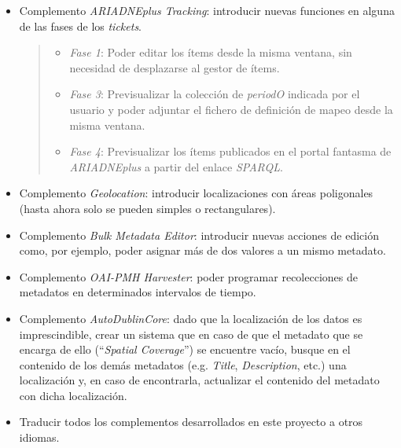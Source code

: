 \begin{itemize}
\item
  Complemento \emph{ARIADNEplus Tracking}: introducir nuevas funciones
  en alguna de las fases de los \emph{tickets}.

  \begin{quote}
  \begin{itemize}
  \tightlist
  \item
    \emph{Fase 1}: Poder editar los ítems desde la misma ventana, sin
    necesidad de desplazarse al gestor de ítems.
  \item
    \emph{Fase 3}: Previsualizar la colección de \emph{periodO} indicada
    por el usuario y poder adjuntar el fichero de definición de mapeo
    desde la misma ventana.
  \item
    \emph{Fase 4}: Previsualizar los ítems publicados en el portal
    fantasma de \emph{ARIADNEplus} a partir del enlace \emph{SPARQL}.
  \end{itemize}
  \end{quote}
\item
  Complemento \emph{Geolocation}: introducir localizaciones con áreas
  poligonales (hasta ahora solo se pueden simples o rectangulares).
\item
  Complemento \emph{Bulk Metadata Editor}: introducir nuevas acciones de
  edición como, por ejemplo, poder asignar más de dos valores a un mismo
  metadato.
\item
  Complemento \emph{OAI-PMH Harvester}: poder programar recolecciones de
  metadatos en determinados intervalos de tiempo.
\item
  Complemento \emph{AutoDublinCore}: 
  dado que la localización de los datos es imprescindible, crear un
  sistema que en caso de que el metadato que se encarga de ello
  (``\emph{Spatial Coverage}'') se encuentre vacío, busque en el contenido
  de los demás metadatos (e.g. \emph{Title}, \emph{Description}, etc.)
  una localización y, en caso de encontrarla, actualizar el contenido
  del metadato con dicha localización.
\item
  Traducir todos los complementos desarrollados en este proyecto a otros idiomas.
\end{itemize}
